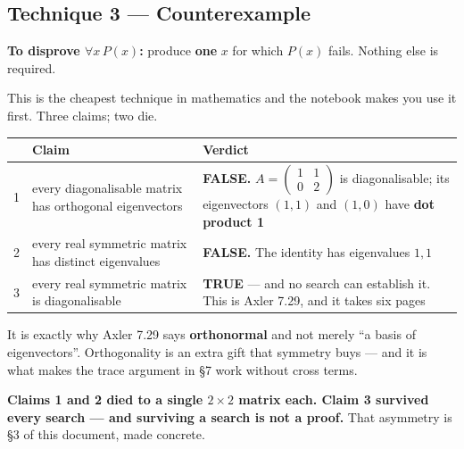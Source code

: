 \subsection{Technique 3 --- Counterexample \ \ }

\begin{techbox}[title={Shape}]
\textbf{To disprove $\forall x\,P(x)$:} produce \textbf{one} $x$ for which $P(x)$ fails. Nothing else
is required.
\end{techbox}

\noindent This is the cheapest technique in mathematics and the notebook makes you use it first.
Three claims; two die.

\begin{center}\small
\begin{tabular}{@{}c>{\raggedright\arraybackslash}p{7.0cm}>{\raggedright\arraybackslash}p{6.7cm}@{}}
\toprule
\rowcolor{alert!12}
& \textbf{\color{alert}Claim} & \textbf{\color{alert}Verdict}\\
\midrule
1 & every diagonalisable matrix has orthogonal eigenvectors &
 \textbf{FALSE.} $A=\left(\begin{smallmatrix}1&1\\0&2\end{smallmatrix}\right)$ is diagonalisable; its
 eigenvectors $(1,1)$ and $(1,0)$ have \textbf{dot product 1}\\
2 & every real symmetric matrix has distinct eigenvalues &
 \textbf{FALSE.} The identity has eigenvalues $1,1$\\
\rowcolor{bio!8}
3 & every real symmetric matrix is diagonalisable &
 \textbf{TRUE} --- and no search can establish it. This is Axler 7.29, and it takes six pages\\
\bottomrule
\end{tabular}
\end{center}

\begin{dobox}[title={Why claim 1 is the one that matters to you}]
It is exactly why Axler 7.29 says \textbf{orthonormal} and not merely ``a basis of eigenvectors''.
Orthogonality is an extra gift that symmetry buys --- and it is what makes the trace argument in §7
work without cross terms.

\textbf{Claims 1 and 2 died to a single $2\times2$ matrix each. Claim 3 survived every search --- and
surviving a search is not a proof.} That asymmetry is §3 of this document, made concrete.
\end{dobox}

